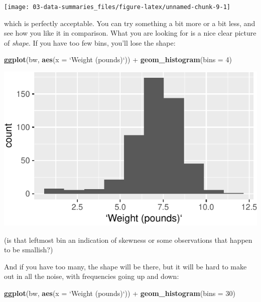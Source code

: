 \documentclass[]{tufte-book}
\newenvironment{Shaded}{}{}
\newcommand{\DataTypeTok}[1]{\textcolor[rgb]{0.56,0.13,0.00}{#1}}
\newcommand{\DecValTok}[1]{\textcolor[rgb]{0.25,0.63,0.44}{#1}}
\newcommand{\KeywordTok}[1]{\textcolor[rgb]{0.00,0.44,0.13}{\textbf{#1}}}
\newcommand{\NormalTok}[1]{#1}
\newcommand{\OperatorTok}[1]{\textcolor[rgb]{0.40,0.40,0.40}{#1}}
\newcommand{\StringTok}[1]{\textcolor[rgb]{0.25,0.44,0.63}{#1}}
\theoremstyle{definition}
\theoremstyle{definition}
\theoremstyle{definition}
\theoremstyle{remark}
\begin{document}
\texttt{[image: 03-data-summaries\_files/figure-latex/unnamed-chunk-9-1]}

which is perfectly acceptable. You can try something a bit more or a bit
less, and see how you like it in comparison. What you are looking for is
a nice clear picture of \emph{shape}. If you have too few bins, you'll
lose the shape:

\begin{Shaded}
\begin{Highlighting}[]
\KeywordTok{ggplot}\NormalTok{(bw, }\KeywordTok{aes}\NormalTok{(}\DataTypeTok{x =} \StringTok{`}\DataTypeTok{Weight (pounds)}\StringTok{`}\NormalTok{)) }\OperatorTok{+}\StringTok{ }\KeywordTok{geom_histogram}\NormalTok{(}\DataTypeTok{bins =} \DecValTok{4}\NormalTok{)}
\end{Highlighting}
\end{Shaded}

\includegraphics{03-data-summaries_files/figure-latex/unnamed-chunk-10-1}

(is that leftmost bin an indication of skewness or some observations
that happen to be smallish?)

And if you have too many, the shape will be there, but it will be hard
to make out in all the noise, with frequencies going up and down:

\begin{Shaded}
\begin{Highlighting}[]
\KeywordTok{ggplot}\NormalTok{(bw, }\KeywordTok{aes}\NormalTok{(}\DataTypeTok{x =} \StringTok{`}\DataTypeTok{Weight (pounds)}\StringTok{`}\NormalTok{)) }\OperatorTok{+}\StringTok{ }\KeywordTok{geom_histogram}\NormalTok{(}\DataTypeTok{bins =} \DecValTok{30}\NormalTok{)}
\end{Highlighting}
\end{Shaded}
\end{document}
